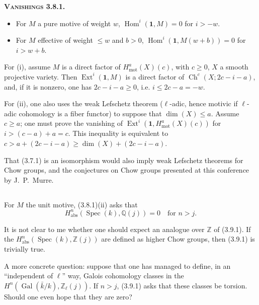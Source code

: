 \documentclass[11pt,a4paper]{article}
\theoremstyle{plain}
\theoremstyle{definition}
\DeclareMathOperator{\Ext}{Ext}
\DeclareMathOperator{\Hom}{Hom}
\DeclareMathOperator{\Spec}{Spec}
\DeclareMathOperator{\Gal}{Gal}
\DeclareMathOperator{\Ch}{Ch}
\newcommand{\Q}{\mathbb{Q}}
\newcommand{\Z}{\mathbb{Z}}
\DeclareMathOperator{\mot}{mot}
\newcommand{\abs}{\mathrm{abs}}
\begin{document}
\textbf{\textsc{Vanishings 3.8.1.}}
\begin{itemize}
\item[(i)] For $M$ a pure motive of weight $w$, $\Hom^i(\mathbf{1},M)=0$ for $i>-w$.
\item[(ii)] For $M$ effective of weight $\leq w$ and $b>0$, $\Hom^i(\mathbf{1},M(w+b))=0$ for $i>w+b$.
\end{itemize}

For (i), assume $M$ is a direct factor of $H^a_{\mot}(X)(c)$, with $c\geq0$, $X$ a smooth projective variety. Then $\Ext^i(\mathbf{1},M)$ is a direct factor of $\Ch^c(X;2c-i-a)$, and, if it is nonzero, one has $2c-i-a\geq0$, i.e. $i\leq2c-a=-w$.

For (ii), one also uses the weak Lefschetz theorem ($\ell$-adic, hence motivic if $\ell$-adic cohomology is a fiber functor) to suppose that $\dim(X)\leq a$. Assume $c\geq a$; one must prove the vanishing of $\Ext^i(\mathbf{1},H^a_{\mot}(X)(c))$ for $i>(c-a)+a=c$. This inequality is equivalent to $c>a+(2c-i-a)\geq\dim(X)+(2c-i-a)$.

That (3.7.1) is an isomorphism would also imply weak Lefschetz theorems for Chow groups, and the conjectures on Chow groups presented at this conference by J.~P.~Murre.

\subsection{}

For $M$ the unit motive, (3.8.1)(ii) asks that
\begin{equation}
\tag{3.9.1}
H^n_{\abs}(\Spec(k),\Q(j))=0\quad\text{for }n>j.
\end{equation}

It is not clear to me whether one should expect an analogue over $\Z$ of (3.9.1). If the $H^n_{\abs}(\Spec(k),\Z(j))$ are defined as higher Chow groups, then (3.9.1) is trivially true.

A more concrete question: suppose that one has managed to define, in an ``independent of $\ell$'' way, Galois cohomology classes in the $H^n(\Gal(\bar{k}/k),\Z_\ell(j))$. If $n>j$, (3.9.1) asks that these classes be torsion. Should one even hope that they are zero?
\end{document}
